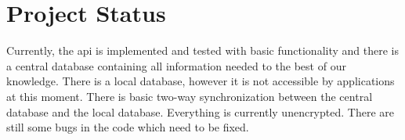 \section{Project Status}

Currently, the \ac{api} is implemented and tested with basic functionality and there is a central database containing all information needed to the best of our knowledge. There is a local database, however it is not accessible by applications at this moment. There is basic two-way synchronization between the central database and the local database. Everything is currently unencrypted. There are still some bugs in the code which need to be fixed.  
